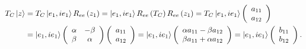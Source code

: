 \documentclass[aps,preprint]{revtex4}%
\begin{document}
\begin{align}
T_{C}\left\vert z\right\rangle  &  =T_{C}\left\vert e_{1},ie_{1}\right\rangle
R_{ee}\left(  z_{1}\right)  =\left\vert e_{1},ie_{1}\right\rangle
R_{ee}\left(  T_{C}\right)  R_{ee}\left(  z_{1}\right)  =T_{C}\left\vert
e_{1},ie_{1}\right\rangle \left(
\begin{array}
[c]{c}%
a_{11}\\
a_{12}%
\end{array}
\right) \\
&  =\left\vert e_{1},ie_{1}\right\rangle \left(
\begin{array}
[c]{cc}%
\alpha & -\beta\\
\beta & \alpha
\end{array}
\right)  \left(
\begin{array}
[c]{c}%
a_{11}\\
a_{12}%
\end{array}
\right)  =\left\vert e_{1},ie_{1}\right\rangle \left(
\begin{array}
[c]{c}%
\alpha a_{11}-\beta a_{12}\\
\beta a_{11}+\alpha a_{12}%
\end{array}
\right)  =\left\vert e_{1},ie_{1}\right\rangle \left(
\begin{array}
[c]{c}%
b_{11}\\
b_{12}%
\end{array}
\right)  .
\end{align}
\end{document}
